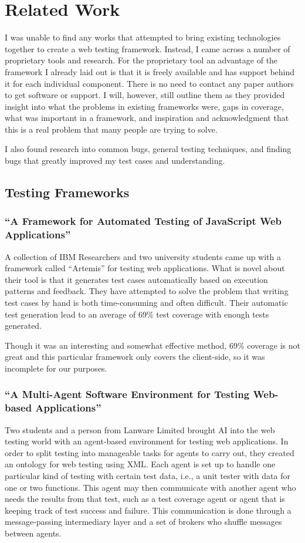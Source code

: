\documentclass[11pt]{article}
\begin{document}
\section{Related Work}
I was unable to find any works that attempted to bring existing technologies together to create a web testing framework. Instead, I came across a number of proprietary tools and research. For the proprietary tool an advantage of the framework I already laid out is that it is freely available and has support behind it for each individual component. There is no need to contact any paper authors to get software or support. I will, however, still outline them as they provided insight into what the problems in existing frameworks were, gaps in coverage, what was important in a framework, and inspiration and acknowledgment that this is a real problem that many people are trying to solve.

I also found research into common bugs, general testing techniques, and finding bugs that greatly improved my test cases and understanding.

\subsection{Testing Frameworks}

\subsubsection{``A Framework for Automated Testing of JavaScript Web Applications'' \cite{FrameworkForAutomatedTesting}}
A collection of IBM Researchers and two university students came up with a framework called ``Artemis'' for testing web applications. What is novel about their tool is that it generates test cases automatically based on execution patterns and feedback. They have attempted to solve the problem that writing test cases by hand is both time-consuming and often difficult. Their automatic test generation lead to an average of 69\% test coverage with enough tests generated.

Though it was an interesting and somewhat effective method, 69\% coverage is not great and this particular framework only covers the client-side, so it was incomplete for our purposes.

\subsubsection{``A Multi-Agent Software Environment for Testing Web-based Applications'' \cite{MultiAgentSoftwareEnvironment}}
Two students and a person from Lanware Limited brought AI into the web testing world with an agent-based environment for testing web applications. In order to split testing into manageable tasks for agents to carry out, they created an ontology for web testing using XML. Each agent is set up to handle one particular kind of testing with certain test data, i.e., a unit tester with data for one or two functions. This agent may then communicate with another agent who needs the results from that test, such as a test coverage agent or agent that is keeping track of test success and failure. This communication is done through a message-passing intermediary layer and a set of brokers who shuffle messages between agents.
\end{document}

